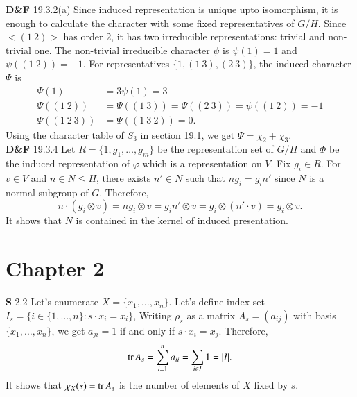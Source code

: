 \documentclass[a4paper, 12pt]{article}
\theoremstyle{Mydefinition}
\theoremstyle{Mytheorem}
\begin{document}
\noindent \textbf{D\&F} 19.3.2(a)
Since induced representation is unique upto isomorphism, it is enough to calculate the character with some fixed representatives of $G/H$. Since $<(1~2)>$ has order $2$, it has two irreducible representations: trivial and non-trivial one. The non-trivial irreducible character $\psi$ is $\psi(1)=1$ and $\psi((1~2)) = -1$. For representatives $\{1, (1~3),(2~3)\}$, the induced character $\Psi$ is
\begin{equation}
    \begin{split}
        \Psi(1) &= 3\psi(1) = 3\\
        \Psi((1~2)) &= \Psi((1~3)) = \Psi((2~3)) = \psi((1~2)) = -1\\
        \Psi((1~2~3)) &= \Psi((1~3~2)) =0.
    \end{split}
\end{equation}
Using the character table of $S_3$ in section 19.1, we get $\Psi = \chi_2+\chi_3$.\\

\noindent \textbf{D\&F} 19.3.4
Let $R = \{1, g_1, \ldots, g_m\}$ be the representation set of $G/H$ and $\Phi$ be the induced representation of $\varphi$ which is a representation on $V$. Fix $g_i\in R$. For $v\in V$ and $n\in N\leq H$, there exists $n'\in N$ such that $ng_i = g_in'$ since $N$ is a normal subgroup of $G$. Therefore,
\begin{equation}
    n\cdot(g_i\otimes v) = ng_i\otimes v = g_in'\otimes v = g_i\otimes (n'\cdot v) =g_i\otimes v.
\end{equation}
It shows that $N$ is contained in the kernel of induced presentation.\\

\newpage
\section{Chapter 2}

\noindent \textbf{S} 2.2
Let's enumerate $X=\{x_1, \ldots, x_n\}$. Let's define index set $I_s = \{i\in \{1, \ldots, n\}:s\cdot x_i = x_i\}$, Writing $\rho_s$ as a matrix $A_s = (a_{ij})$ with basis $\{x_1, \ldots, x_n\}$, we get $a_{ji} = 1$ if and only if $s\cdot x_i = x_j$. Therefore,
\begin{equation}
    \tr A_s = \sum_{i=1}^n a_{ii} = \sum_{i\in I} 1 = \abs{I}. 
\end{equation}
It shows that $\chi_{X}(s) = \tr A_s$ is the number of elements of $X$ fixed by $s$.\\
\end{document}
